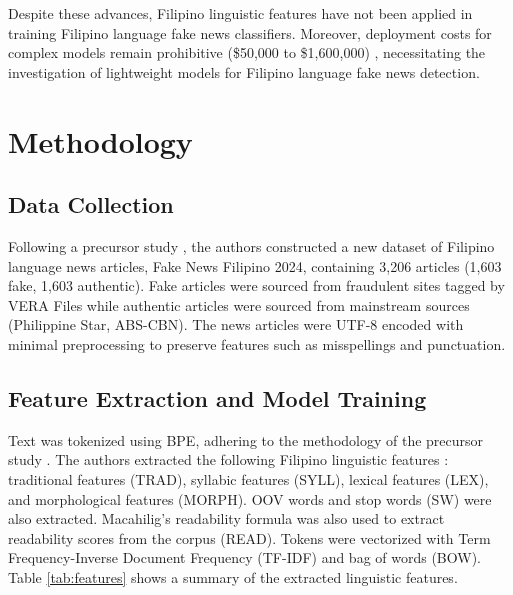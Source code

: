 \documentclass[conference]{IEEEtran}
\begin{document}
Despite these advances, Filipino linguistic features have not been applied in training Filipino language fake news classifiers. Moreover, deployment costs for complex models remain prohibitive (\$50,000 to \$1,600,000) \cite{b4}, necessitating the investigation of lightweight models for Filipino language fake news detection.

\section{Methodology}

\subsection{Data Collection}
Following a precursor study \cite{b3}, the authors constructed a new dataset of Filipino language news articles, Fake News Filipino 2024, containing 3,206 articles (1,603 fake, 1,603 authentic). Fake articles were sourced from fraudulent sites tagged by VERA Files while authentic articles were sourced from mainstream sources (Philippine Star, ABS-CBN). The news articles were UTF-8 encoded with minimal preprocessing to preserve features such as misspellings and punctuation.

\subsection{Feature Extraction and Model Training}
Text was tokenized using BPE, adhering to the methodology of the precursor study \cite{b3}. The authors extracted the following Filipino linguistic features \cite{b8,b9,b10}: traditional features (TRAD), syllabic features (SYLL), lexical features (LEX), and morphological features (MORPH). OOV words and stop words (SW) were also extracted. Macahilig's readability formula \cite{b10} was also used to extract readability scores from the corpus (READ). Tokens were vectorized with Term Frequency-Inverse Document Frequency (TF-IDF) and bag of words (BOW). Table \ref{tab:features} shows a summary of the extracted linguistic features.
\end{document}
